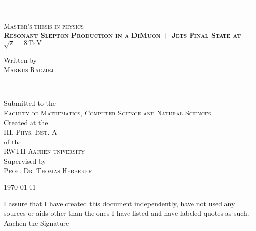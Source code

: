 \documentclass[11pt,a4paper,twoside,openright,DIV=13,BCOR=1cm]{scrbook} %
\numberwithin{equation}{chapter} %
\numberwithin{figure}{chapter} %
\numberwithin{table}{chapter} %
\begin{document}
\pagestyle{empty}

\begin{titlepage}
  \begin{center}
    \vspace{3.0cm}
    
    \rule{\linewidth}{0.5pt} \\
    \textsc{Master's thesis in physics} \\[0.4cm]
    
    \doublespacing
    \textsc{\LARGE \textbf{Resonant Slepton Production in a DiMuon + Jets Final State at $\sqrt{s} = 8\,\text{TeV}$}}\\[1.5cm]
    \singlespacing
    
    Written by\\[0.2cm]
    \textsc{Markus Radziej}\\
    
    
    \rule{\linewidth}{0.5pt} \\[3cm]
    
    
    
    Submitted to the\\
    \textsc{\large Faculty of Mathematics, Computer Science and Natural Sciences}\\[1.5cm]
    Created at the\\
    \textsc{\large III. Phys. Inst. A} \\[0.2cm]
    of the\\
    \textsc{\large RWTH Aachen university} \\[0.5cm]
    
    Supervised by\\
    \textsc{Prof. Dr. Thomas Hebbeker}
    
    \vfill
    {\large \today}
    
  \end{center}
\end{titlepage}

\clearpage{\pagestyle{empty}\cleardoublepage} %


\newpage
\noindent I assure that I have created this document independently, have not used any sources or aids other than the ones I have listed and have labeled quotes as such.\\[1.0cm]
\noindent Aachen the \hfill Signature
\end{document}
